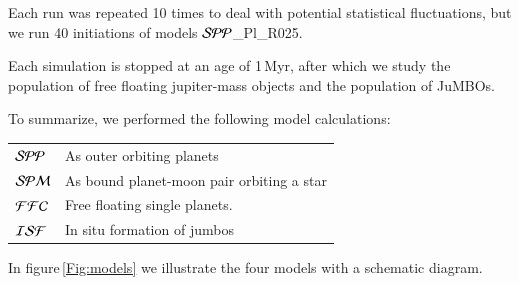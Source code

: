 \documentclass[aa]{lib/aa}
\newcommand{\jumbos}{\mbox{JuMBOs}}
\begin{document}
Each run was repeated 10 times to deal with potential statistical
fluctuations, but we run 40 initiations of models ${\cal SPP}$\_Pl\_R025.

Each simulation is stopped at an age of 1\,Myr, after which we study
the population of free floating jupiter-mass objects and the
population of \jumbos.

To summarize, we performed the following model calculations:\\
\begin{tabular}{ll}
${\cal SPP}$ & As outer orbiting planets\\
${\cal SPM}$ & As bound planet-moon pair orbiting a star\\
${\cal FFC}$ & Free floating single planets.\\
${\cal ISF}$ & In situ formation of jumbos\\
\end{tabular}
In figure\,\ref{Fig:models} we illustrate the four models with a
schematic diagram.

\end{document}

